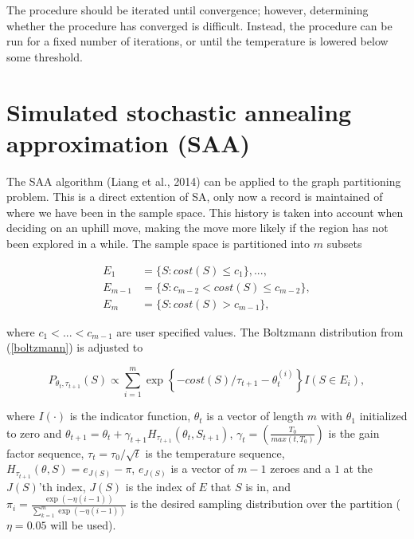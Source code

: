 \documentclass[11pt,]{article}
\begin{document}
\vspace{2pc}

The procedure should be iterated until convergence; however, determining
whether the procedure has converged is difficult. Instead, the procedure
can be run for a fixed number of iterations, or until the temperature is
lowered below some threshold.

\section{Simulated stochastic annealing approximation
(SAA)}\label{simulated-stochastic-annealing-approximation-saa}

The SAA algorithm (Liang et al., 2014) can be applied to the graph
partitioning problem. This is a direct extention of SA, only now a
record is maintained of where we have been in the sample space. This
history is taken into account when deciding on an uphill move, making
the move more likely if the region has not been explored in a while. The
sample space is partitioned into \(m\) subsets

\begin{align*}
E_1 &= \{S : cost(S) \leq c_1\}, ..., \\
E_{m - 1} &= \{S : c_{m - 2} < cost(S) \leq c_{m-2}\}, \\
E_{m} &= \{S : cost(S) > c_{m - 1}\},
\end{align*}

\noindent where \(c_1 < ... < c_{m - 1}\) are user specified values. The
Boltzmann distribution from (\ref{boltzmann}) is adjusted to

\begin{equation}
P_{\theta_t, \tau_{t + 1}}(S) \propto \sum_{i = 1}^{m} \exp \left\{-cost(S)/\tau_{t + 1} - \theta_{t}^{(i)}\right\}I(S \in E_i),
\end{equation}

\noindent where \(I(\cdot)\) is the indicator function, \(\theta_t\) is
a vector of length \(m\) with \(\theta_1\) initialized to zero and
\(\theta_{t + 1} = \theta_t + \gamma_{t + 1}H_{\tau_{t + 1}}(\theta_t, S_{t+1})\),
\(\gamma_t = \left(\frac{T_0}{max(t, T_0)}\right)\) is the gain factor
sequence, \(\tau_t = \tau_0/\sqrt{t}\) is the temperature sequence,
\(H_{\tau_{t + 1}}(\theta, S) = e_{J(S)} - \pi\), \(e_{J(S)}\) is a
vector of \(m-1\) zeroes and a \(1\) at the \(J(S)\)'th index, \(J(S)\)
is the index of \(E\) that \(S\) is in, and
\(\pi_i = \frac{\exp(-\eta(i - 1))}{\sum_{k = 1}^{m}\exp(-\eta(i - 1))}\)
is the desired sampling distribution over the partition (\(\eta = 0.05\)
will be used).
\end{document}
